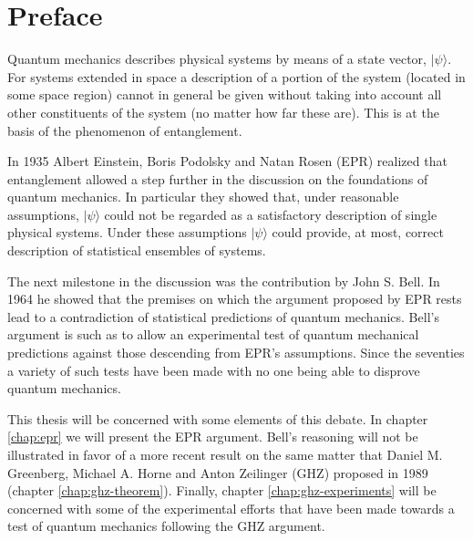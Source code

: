 \chapter*{Preface}
Quantum mechanics describes physical systems by means of a state vector, $| \psi \rangle$. For systems extended in space a description of a portion of the system (located in some space region) cannot in general be given without taking into account all other constituents of the system (no matter how far these are). This is at the basis of the phenomenon of entanglement.

In 1935 Albert Einstein, Boris Podolsky and Natan Rosen (EPR) realized that entanglement allowed a step further in the discussion on the foundations of quantum mechanics. In particular they showed that, under reasonable assumptions, $| \psi \rangle$ could not be regarded as a satisfactory description of single physical systems. Under these assumptions $| \psi \rangle$ could provide, at most, correct description of statistical ensembles of systems.

The next milestone in the discussion was the contribution by John S. Bell. In 1964 he showed that the premises on which the argument proposed by EPR rests lead to a contradiction of statistical predictions of quantum mechanics. Bell's argument is such as to allow an experimental test of quantum mechanical predictions against those descending from EPR's assumptions. Since the seventies a variety of such tests have been made with no one being able to disprove quantum mechanics.

This thesis will be concerned with some elements of this debate. In chapter \ref{chap:epr} we will present the EPR argument. Bell's reasoning will not be illustrated in favor of a more recent result on the same matter that Daniel M. Greenberg, Michael A. Horne and Anton Zeilinger (GHZ) proposed in 1989 (chapter \ref{chap:ghz-theorem}). Finally, chapter \ref{chap:ghz-experiments} will be concerned with some of the experimental efforts that have been made towards a test of quantum mechanics following the GHZ argument.
